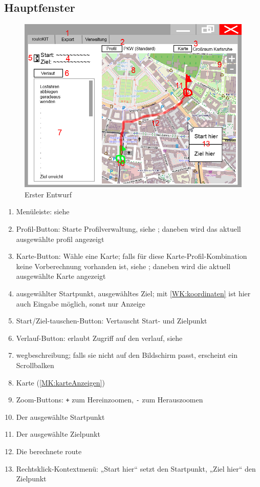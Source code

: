 \documentclass[a4paper, 11pt]{article}
\begin{document}
\subsection{Hauptfenster}
\begin{figure}[H]
\centering
\includegraphics[width=0.7\linewidth]{mockup_screenshot_main}
\caption{Erster Entwurf}
\label{fig:mockupscreenshotmain}
\end{figure}
\begin{enumerate}
\item Menüleiste: siehe 
\item Profil-Button: Starte Profilverwaltung, siehe ; daneben wird das aktuell ausgewählte \gls{profil} angezeigt
\item Karte-Button: Wähle eine Karte; falls für diese Karte-Profil-Kombination keine Vorberechnung vorhanden ist, siehe ; daneben wird die aktuell ausgewählte Karte angezeigt
\item ausgewählter Startpunkt, ausgewähltes Ziel; mit \ref{WK:koordinaten} ist hier auch Eingabe möglich, sonst nur Anzeige
\item Start/Ziel-tauschen-Button: Vertauscht Start- und Zielpunkt
\item Verlauf-Button: erlaubt Zugriff auf den \gls{verlauf}, siehe 
\item \gls{wegbeschreibung}; falls sie nicht auf den Bildschirm passt, erscheint ein Scrollbalken
\item Karte (\ref{MK:karteAnzeigen})
\item Zoom-Buttons: \texttt{+} zum Hereinzoomen, \texttt{-} zum Herauszoomen
\item Der ausgewählte Startpunkt
\item Der ausgewählte Zielpunkt
\item Die berechnete \gls{route}
\item Rechtsklick-Kontextmenü: „Start hier“ setzt den Startpunkt, „Ziel hier“ den Zielpunkt
\end{enumerate}
\end{document}
